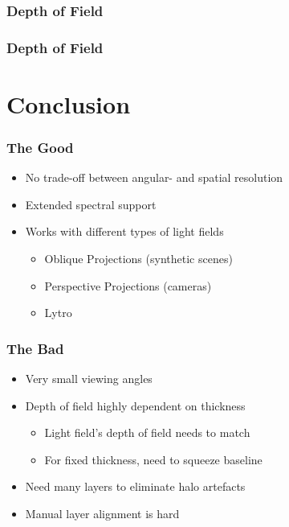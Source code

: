 \documentclass[12pt, compress]{beamer}
\begin{document}
\begin{frame}[fragile]
	\frametitle{Depth of Field}
	
	\begin{figure}
		
	\end{figure}
\end{frame}

\begin{frame}[fragile]
	\frametitle{Depth of Field}
	
	\begin{figure}
		
	\end{figure}
\end{frame}

\section{Conclusion}

\begin{frame}[fragile]
	\frametitle{The Good}
	
	\begin{itemize}
		\item No trade-off between angular- and spatial resolution
		\item Extended spectral support
		\item Works with different types of light fields
		\begin{itemize}
			\item Oblique Projections (synthetic scenes)
			\item Perspective Projections (cameras)
			\item Lytro
		\end{itemize}
	\end{itemize}
\end{frame}

\begin{frame}[fragile]
	\frametitle{The Bad}
	
	\begin{itemize}
		\item Very small viewing angles
		\item Depth of field highly dependent on thickness
		\begin{itemize}
			\item Light field's depth of field needs to match
			\item For fixed thickness, need to squeeze baseline
		\end{itemize}
		\item Need many layers to eliminate halo artefacts
		\item Manual layer alignment is hard
	\end{itemize}
\end{frame}
\end{document}
